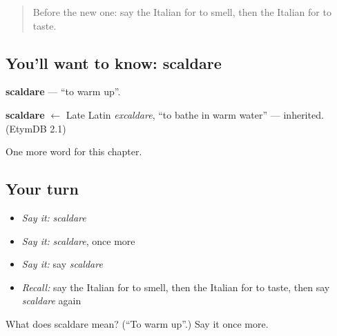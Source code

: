 \begin{quote}
Before the new one: say the Italian for to smell, then the Italian for to taste.
\end{quote}

\subsection*{You'll want to know: scaldare}
\textbf{scaldare} — \textquotedblleft{}to warm up\textquotedblright{}.

\begin{cousinweb}
\textbf{scaldare} $\leftarrow$ Late Latin \emph{excaldare}, \textquotedblleft{}to bathe in warm water\textquotedblright{} — inherited. (EtymDB 2.1)
\end{cousinweb}

\begin{grammarlens}[title={What you've built}]
One more word for this chapter.
\end{grammarlens}

\subsection*{Your turn}
\begin{itemize}
\raggedright
  \item \emph{Say it:} \emph{scaldare}
  \item \emph{Say it:} \emph{scaldare}, once more
  \item \emph{Say it:} say \emph{scaldare}
  \item \emph{Recall:} say the Italian for to smell, then the Italian for to taste, then say \emph{scaldare} again
\end{itemize}

\begin{tcolorbox}[breakable,colback=teal!4,colframe=teal!35!black,title={Before you move on}]
What does scaldare mean? (\textquotedblleft{}To warm up\textquotedblright{}.) Say it once more.
\end{tcolorbox}
